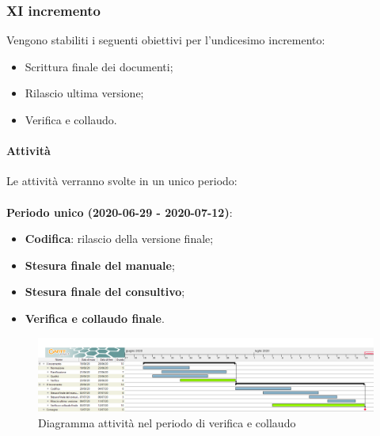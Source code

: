 \documentclass[../piano-di-progetto.tex]{subfiles}
\begin{document}
\subsubsection{XI incremento}
 Vengono stabiliti i seguenti obiettivi per l'undicesimo incremento:
 \begin{itemize}
     \item Scrittura finale dei documenti;
     \item Rilascio ultima versione;
     \item Verifica e collaudo.
 \end{itemize}

\paragraph{Attività}
Le attività verranno svolte in un unico periodo:
\\
\\
\textbf{Periodo unico (2020-06-29 - 2020-07-12)}:
\begin{itemize}
    \item \textbf{Codifica}: rilascio della versione finale;
    \item \textbf{Stesura finale del manuale};
    \item \textbf{Stesura finale del consultivo};
    \item \textbf{Verifica e collaudo finale}.
\end{itemize}



\newpage
\begin{landscape}
    \begin{figure}[H]
        \centering
        \includegraphics[width=24cm]{img/verifica.png}
        \caption{Diagramma attività nel periodo di verifica e collaudo}
      \end{figure}
\end{landscape}
\end{document}
